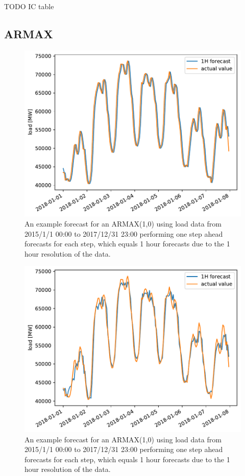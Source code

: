 TODO IC table

\subsection*{ARMAX}

\begin{figure}[h!]%
\centering
\includegraphics[width=\textwidth]{plots/ARMAXfc/ARMAX_p1q0_data2015to2017_fcto2018123123_weekend_plot_range2018010100_2018010723}%
\caption{An example forecast for an ARMAX(1,0) using load data from 2015/1/1 00:00 to 2017/12/31 23:00 performing one step ahead forecasts for each step, which equals 1 hour forecasts due to the 1 hour resolution of the data.}%
\label{fig:armax_fc_weekend}%
\end{figure}

\begin{figure}[h!]%
\centering
\includegraphics[width=\textwidth]{plots/ARMAXfc/ARMAX_p1q0_data2015to2017_fcto2018123123_load_lag_plot_range2018010100_2018010723}%
\caption{An example forecast for an ARMAX(1,0) using load data from 2015/1/1 00:00 to 2017/12/31 23:00 performing one step ahead forecasts for each step, which equals 1 hour forecasts due to the 1 hour resolution of the data.}%
\label{fig:armax_fc_load_lag}%
\end{figure}

